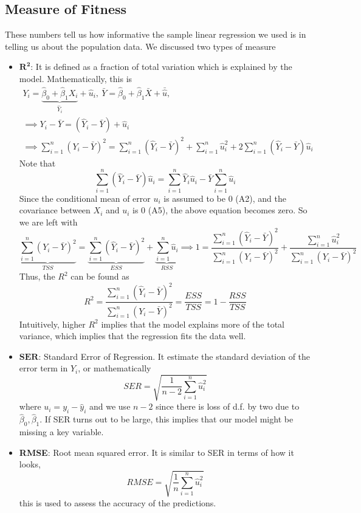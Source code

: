 \documentclass[12pt]{article}
\theoremstyle{definition}
\theoremstyle{property}
\theoremstyle{assumption}
\theoremstyle{example}
\theoremstyle{comment}
\begin{document}
\subsection{Measure of Fitness}
These numbers tell us how informative the sample linear regression we used is in telling us about the population data. We discussed two types of measure
\begin{itemize}
\item $\mathbf{R^2}$: It is defined as a fraction of total variation which is explained by the model. Mathematically, this is
\begin{gather*}
Y_i = \underbrace{\hat{\beta}_0 + \hat{\beta}_1X_i}_{\hat{Y}_i} + \hat{u}_i, \ \bar{Y} = \hat{\beta}_0 + \hat{\beta}_1\bar{X} + \bar{\hat{u}}, \\
\implies Y_i-\bar{Y} = (\hat{Y}_i - \bar{Y}) + \hat{u}_i \\
\implies \sum_{i=1}^n (Y_i-\bar{Y})^2= \sum_{i=1}^n (\hat{Y}_i - \bar{Y})^2+\sum_{i=1}^n\hat{u}_i^2 + 2\sum_{i=1}^n(\hat{Y}_i - \bar{Y}) \hat{u}_i
\end{gather*}
Note that 
\[
\sum_{i=1}^n(\hat{Y}_i - \bar{Y}) \hat{u}_i=\sum_{i=1}^n\hat{Y}_i{\hat{u}}_i-\bar{Y}\sum_{i=1}^n\hat{u}_i 
\]
Since the conditional mean of error $u_i$ is assumed to be 0 (A2), and the covariance between $X_i$ and $u_i$ is 0 (A5), the above equation becomes zero. So we are left with
\[
\underbrace{\sum_{i=1}^n (Y_i-\bar{Y})^2}_{TSS}= \underbrace{\sum_{i=1}^n (\hat{Y}_i - \bar{Y})^2}_{ESS}+\underbrace{\sum_{i=1}^n\hat{u}_i}_{RSS} \implies 1=\frac{\sum_{i=1}^n (\hat{Y}_i - \bar{Y})^2}{\sum_{i=1}^n (Y_i-\bar{Y})^2} + \frac{\sum_{i=1}^n\hat{u}_i ^2 }{\sum_{i=1}^n (Y_i-\bar{Y})^2}
\]
Thus, the $R^2$ can be found as
\[
R^2 = \frac{\sum_{i=1}^n (\hat{Y}_i - \bar{Y})^2}{\sum_{i=1}^n (Y_i-\bar{Y})^2} = \frac{ESS}{TSS} = 1-\frac{RSS}{TSS}
\]
Intuitively, higher $R^2$ implies that the model explains more of the total variance, which implies that the regression fits the data well. 
\item $\mathbf{SER}$: Standard Error of Regression. It estimate the standard deviation of the error term in $Y_i$, or mathematically
\[
SER = \sqrt{\frac{1}{n-2}\sum_{i=1}^n \hat{u}_i^2}
\]
where $u_i = y_i-\hat{y}_i$ and we use $n-2$ since there is loss of d.f. by two due to $\hat{\beta}_0, \hat{\beta}_1$. If SER turns out to be large, this implies that our model might be missing a key variable.
 \item \textbf{RMSE}: Root mean squared error. It is similar to SER in terms of how it looks, 
\[
RMSE = \sqrt{\frac{1}{n}\sum_{i=1}^n \hat{u}_i^2}
\]
this is used to assess the accuracy of the predictions.
\end{itemize}
\end{document}

